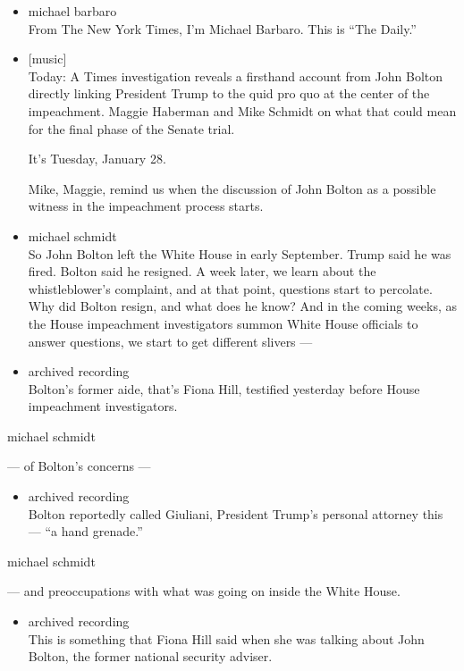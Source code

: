 \begin{itemize}
\item
  michael barbaro\\
  From The New York Times, I'm Michael Barbaro. This is ``The Daily.''
\item
  {[}music{]}\\
  Today: A Times investigation reveals a firsthand account from John
  Bolton directly linking President Trump to the quid pro quo at the
  center of the impeachment. Maggie Haberman and Mike Schmidt on what
  that could mean for the final phase of the Senate trial.

  It's Tuesday, January 28.

  Mike, Maggie, remind us when the discussion of John Bolton as a
  possible witness in the impeachment process starts.
\item
  michael schmidt\\
  So John Bolton left the White House in early September. Trump said he
  was fired. Bolton said he resigned. A week later, we learn about the
  whistleblower's complaint, and at that point, questions start to
  percolate. Why did Bolton resign, and what does he know? And in the
  coming weeks, as the House impeachment investigators summon White
  House officials to answer questions, we start to get different slivers
  ---
\item
  archived recording\\
  Bolton's former aide, that's Fiona Hill, testified yesterday before
  House impeachment investigators.
\end{itemize}

michael schmidt

--- of Bolton's concerns ---

\begin{itemize}
\tightlist
\item
  archived recording\\
  Bolton reportedly called Giuliani, President Trump's personal attorney
  this --- ``a hand grenade.''
\end{itemize}

michael schmidt

--- and preoccupations with what was going on inside the White House.

\begin{itemize}
\tightlist
\item
  archived recording\\
  This is something that Fiona Hill said when she was talking about John
  Bolton, the former national security adviser.
\end{itemize}

